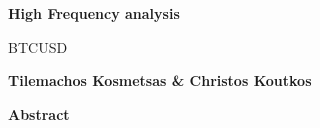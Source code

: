 \thispagestyle{plain}
\begin{center}
    \Large
    \textbf{High Frequency analysis}
    
    \vspace{0.4cm}
    \large
    BTCUSD
    
    \vspace{0.4cm}
    \textbf{Tilemachos Kosmetsas \& Christos Koutkos}
    
    \vspace{0.9cm}
    \textbf{Abstract}
\end{center}
